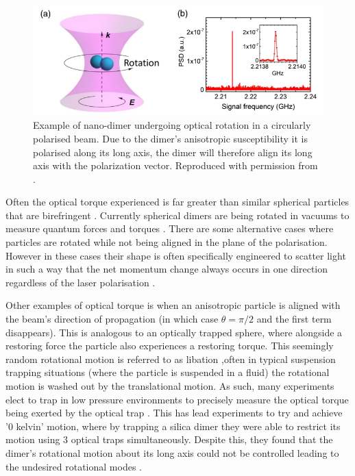 \begin{figure}[h!]
	\centering
	\includegraphics[width=\linewidth]{dimer_rotation.jpeg}
	\caption{Example of nano-dimer undergoing optical rotation 
		in a circularly polarised beam. Due to the dimer's 
		anisotropic susceptibility it is polarised along its 
		long axis, the dimer will therefore align its long axis 
		with the polarization vector. Reproduced with permission 
		from \cite{Reimann2018}.}
\end{figure}

Often the optical torque experienced is far greater than similar 
spherical particles that are birefringent \cite{Bruce2020}. 
Currently spherical dimers are being rotated in vacuums to 
measure quantum forces and torques \cite{Ahn2018, Reimann2018}. 
There are some alternative cases where particles are rotated 
while not being aligned in the plane of the polarisation. However 
in these cases their shape is often specifically engineered to 
scatter light in such a way that the net momentum change always
occurs in one direction regardless of the laser polarisation 
\cite{Higurashi1994}. 

Other examples of optical torque is when an anisotropic 
particle is aligned with the beam's direction of propagation 
(in which case $\theta=\pi/2$ and the first term disappears). 
This is analogous to an optically trapped sphere, where 
alongside a restoring force the particle also experiences a 
restoring torque. This seemingly random rotational motion is 
referred to as libation \cite{Bruce2020},often in typical 
suspension trapping situations (where the particle is suspended 
in a fluid) the rotational motion is washed out by the 
translational motion. As such, many experiments elect to trap 
in low pressure environments to precisely measure the optical 
torque being exerted by the optical trap \cite{Ahn2018}. This 
has lead experiments to try and achieve '0 kelvin' motion, 
where by trapping a silica dimer they were able to restrict its 
motion using 3 optical traps simultaneously. Despite this, they 
found that the dimer's rotational motion about its long axis 
could not be controlled leading to the undesired rotational
modes \cite{Bang2020}.

